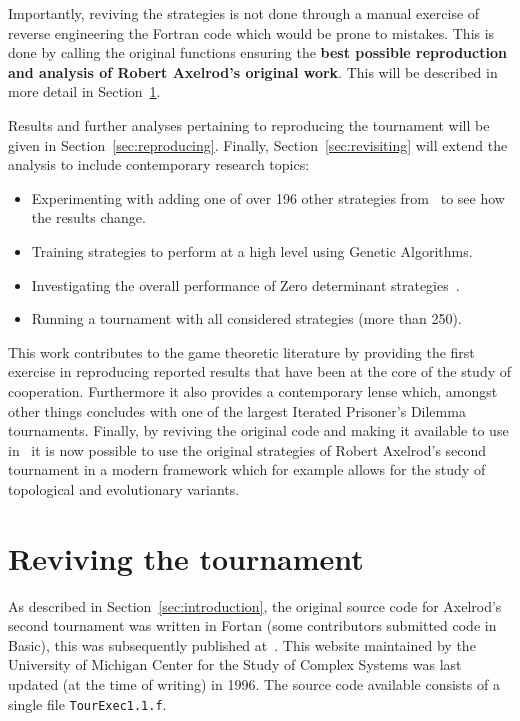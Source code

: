 \documentclass{article}
\begin{document}
Importantly, reviving the strategies is not done
through a manual exercise of reverse engineering the Fortran code which would be
prone to mistakes. This is done by calling the original functions ensuring the
\textbf{best possible reproduction and analysis of Robert Axelrod's original
work}. This will be described in more detail in Section~\ref{sec:reviving}.

Results and further analyses pertaining to reproducing the tournament will be
given in Section~\ref{sec:reproducing}. Finally, Section~\ref{sec:revisiting}
will extend the analysis to include contemporary research topics:

\begin{itemize}
    \item Experimenting with adding one of over 196 other strategies
        from~\cite{AxelrodProject} to see how the results change.
    \item Training strategies to perform at a high level using Genetic Algorithms.
    \item Investigating the overall performance of Zero determinant
        strategies~\cite{Press2012}.
    \item Running a tournament with all considered strategies (more than 250).
\end{itemize}

This work contributes to the game theoretic literature by providing the first
exercise in reproducing reported results that have been at the core of the study
of cooperation. Furthermore it also provides a contemporary lense which, amongst
other things concludes with one of the largest Iterated Prisoner's Dilemma
tournaments.
Finally, by reviving the original code and making it available to use
in~\cite{AxelrodProject} it is now possible to use the original strategies of
Robert Axelrod's second tournament in a modern framework which for example
allows for the study of topological and evolutionary variants.

\section{Reviving the tournament}\label{sec:reviving}

As described in Section~\ref{sec:introduction}, the original source code for
Axelrod's second tournament was written in Fortan (some contributors submitted
code in Basic), this was subsequently published at~\cite{Axelrod1980bCode}. This
website maintained by the University of Michigan Center for the Study of Complex
Systems was last updated (at the time of writing) in 1996. The source code
available consists of a single file \texttt{TourExec1.1.f}.
\end{document}
